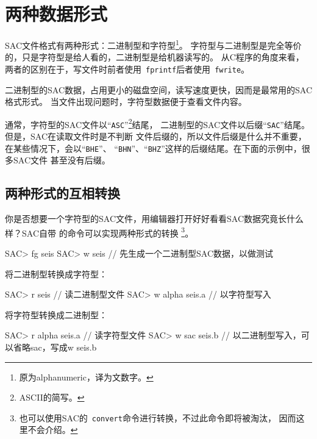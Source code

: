 \section{两种数据形式}
SAC文件格式有两种形式：二进制型和字符型\footnote{原为alphanumeric，译为文数字。}。
字符型与二进制型是完全等价的，只是字符型是给人看的，二进制型是给机器读写的。
从C程序的角度来看，两者的区别在于，写文件时前者使用~\verb+fprintf+后者使用~\verb+fwrite+。

二进制型的SAC数据，占用更小的磁盘空间，读写速度更快，因而是最常用的SAC格式形式。
当文件出现问题时，字符型数据便于查看文件内容。

通常，字符型的SAC文件以``\verb+ASC+''\footnote{ASCII的简写。}结尾，
二进制型的SAC文件以后缀``\verb+SAC+''结尾。但是，SAC在读取文件时是不判断
文件后缀的，所以文件后缀是什么并不重要，在某些情况下，会以``\verb+BHE+''、
``\verb+BHN+''、``\verb+BHZ+''这样的后缀结尾。在下面的示例中，很多SAC文件
甚至没有后缀。

\subsection{两种形式的互相转换}
你是否想要一个字符型的SAC文件，用编辑器打开好好看看SAC数据究竟长什么样？SAC自带
的命令可以实现两种形式的转换
\footnote{也可以使用SAC的~\verb+convert+命令进行转换，不过此命令即将被淘汰，
因而这里不会介绍。}。
\begin{SACCode}
SAC> fg seis
SAC> w seis             // 先生成一个二进制型SAC数据，以做测试
\end{SACCode}

将二进制型转换成字符型：
\begin{SACCode}
SAC> r seis             // 读二进制型文件
SAC> w alpha seis.a     // 以字符型写入
\end{SACCode}

将字符型转换成二进制型：
\begin{SACCode}
SAC> r alpha seis.a     // 读字符型文件
SAC> w sac seis.b       // 以二进制型写入，可以省略sac，写成w seis.b
\end{SACCode}


